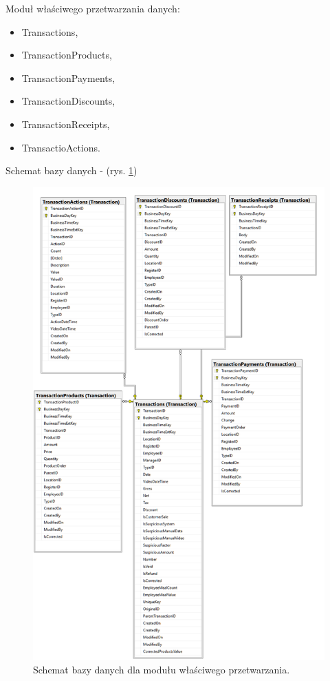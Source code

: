 \documentclass[a4paper]{book}
\begin{document}
\newline
Moduł właściwego przetwarzania danych:
\begin{itemize}
	\item Transactions,
	\item TransactionProducts,
	\item TransactionPayments,
	\item TransactionDiscounts,
	\item TransactionReceipts,
	\item TransactioActions.
\end{itemize}
Schemat bazy danych - (rys. \ref{fig:parser_database_schema})
\begin{figure}[t]
	\centering
	\includegraphics[width=\textwidth]{./img/parser_database_schema.png}
	\caption{Schemat bazy danych dla modułu właściwego przetwarzania.}
	\label{fig:parser_database_schema}
\end{figure} 
\end{document}
